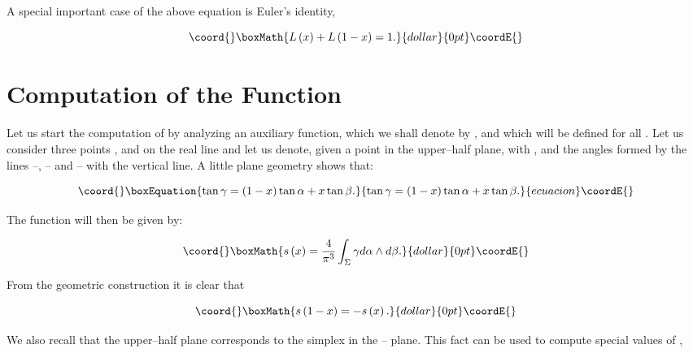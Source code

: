 \documentclass[a4paper,11pt]{article}
\providecommand{\mathbb}[1]{{\bf{#1}}}
\begin{document}
\noindent
A special important case of the above equation is Euler's identity,

$$\coord{}\boxMath{
L\left( x\right) + L\left( 1-x\right) =1.
}{dollar}{0pt}\coordE{}$$


\section{Computation of the Function \coordHE{}}


Let us start the computation of \coordHE{} by analyzing an auxiliary function,
which we shall denote by \coordHE{}, and which will be defined for 
all \myHighlight{$x\in \mathbb{R}$}\coordHE{}. Let us consider three points \coordHE{}, \coordHE{} and \coordHE{} on the 
real line and let us denote, given a point \coordHE{} in the upper--half plane, with 
\myHighlight{$\alpha$}\coordHE{}, \myHighlight{$\beta$}\coordHE{} and \myHighlight{$\gamma$}\coordHE{} the angles formed by the lines \coordHE{}--\coordHE{}, 
\coordHE{}--\coordHE{} and \coordHE{}--\coordHE{} with the vertical line. A little plane geometry shows 
that:

\begin{equation}\coord{}\boxEquation{
\tan \gamma =\left( 1-x\right) \tan \alpha +x\tan \beta . \label{app2}
}{
\tan \gamma =\left( 1-x\right) \tan \alpha +x\tan \beta . }{ecuacion}\coordE{}\end{equation}

\noindent
The function \coordHE{} will then be given by:

$$\coord{}\boxMath{
s\left( x\right) = \frac{4}{\pi ^{3}}\int_{\Sigma }\gamma d\alpha \wedge
d\beta .
}{dollar}{0pt}\coordE{}$$

\noindent
From the geometric construction it is clear that 

$$\coord{}\boxMath{
s\left( 1-x\right) = - s\left( x\right) .
}{dollar}{0pt}\coordE{}$$

\noindent
We also recall that the upper--half plane \myHighlight{$\Sigma $}\coordHE{} corresponds to the
simplex \coordHE{} in the 
\myHighlight{$\alpha $}\coordHE{}--\myHighlight{$\beta $}\coordHE{} plane. This fact can be used to compute special values of 
\coordHE{},
\end{document}

